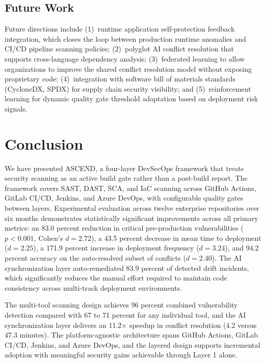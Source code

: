 \documentclass{ieeeaccess}
\begin{document}
\subsection{Future Work}
Future directions include (1)~runtime application self-protection feedback integration, which closes the loop between production runtime anomalies and CI/CD pipeline scanning policies; (2)~polyglot AI conflict resolution that supports cross-language dependency analysis; (3)~federated learning to allow organizations to improve the shared conflict resolution model without exposing proprietary code; (4)~integration with software bill of materials standards (CycloneDX, SPDX) for supply chain security visibility; and (5)~reinforcement learning for dynamic quality gate threshold adaptation based on deployment risk signals.

\section{Conclusion}
\label{sec:conclusion}
We have presented ASCEND, a four-layer DevSecOps framework that treats security scanning as an active build gate rather than a post-build report. The framework covers SAST, DAST, SCA, and IaC scanning across GitHub Actions, GitLab CI/CD, Jenkins, and Azure DevOps, with configurable quality gates between layers. Experimental evaluation across twelve enterprise repositories over six months demonstrates statistically significant improvements across all primary metrics: an 83.0 percent reduction in critical pre-production vulnerabilities ($p < 0.001$, Cohen's $d = 2.72$), a 43.5 percent decrease in mean time to deployment ($d = 2.25$), a 171.9 percent increase in deployment frequency ($d = 3.24$), and 94.2 percent accuracy on the auto-resolved subset of conflicts ($d = 2.40$). The AI synchronization layer auto-remediated 83.9 percent of detected drift incidents, which significantly reduces the manual effort required to maintain code consistency across multi-track deployment environments.

The multi-tool scanning design achieves 96 percent combined vulnerability detection compared with 67 to 71 percent for any individual tool, and the AI synchronization layer delivers an 11.2$\times$ speedup in conflict resolution (4.2 versus 47.3 minutes). The platform-agnostic architecture spans GitHub Actions, GitLab CI/CD, Jenkins, and Azure DevOps, and the layered design supports incremental adoption with meaningful security gains achievable through Layer 1 alone.
\end{document}
